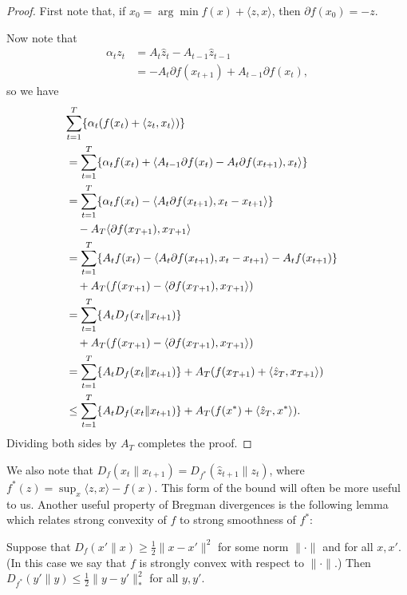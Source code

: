 \documentclass{article} %
\begin{document}
\begin{proof}
First note that, if $x_0 = \arg\min f(x) + \langle z, x \rangle$, 
then $\partial f(x_0) = -z$.

Now note that
\begin{align}
\alpha_{t}z_{t} 
&= A_{t}\hat z_{t} - A_{t-1}\hat z_{t-1} \\
&= - A_{t}\partial f(x_{t+1}) + A_{t-1} \partial f(x_{t}),
\end{align}
so we have
\begin{align} 
\lefteqn{\sum_{t=1}^T \{\alpha_t(f(x_t) + \langle z_t, x_t \rangle)\}} \\
 &= \sum_{t=1}^T \{\alpha_t f(x_t) + \langle A_{t-1} \partial f(x_t) - A_t \partial f(x_{t+1}), x_t \rangle\} \\
 &= \sum_{t=1}^T \{\alpha_t f(x_t) - \langle A_{t} \partial f(x_{t+1}), x_t-x_{t+1} \rangle\} \\
 & \quad - A_{T}\langle \partial f(x_{T+1}), x_{T+1} \rangle \\
 &= \sum_{t=1}^T \{A_t f(x_t) - \langle A_{t} \partial f(x_{t+1}), x_t-x_{t+1} \rangle - A_t f(x_{t+1})\}  \\
 &\quad+ A_T(f(x_{T+1}) - \langle \partial f(x_{T+1}), x_{T+1} \rangle) \nonumber \\ 
 &= \sum_{t=1}^T \{A_tD_f(x_t \| x_{t+1})\}  \\ 
 &\quad+ A_T(f(x_{T+1}) - \langle \partial f(x_{T+1}), x_{T+1} \rangle) \nonumber \\
 &= \sum_{t=1}^T \{A_tD_f(x_t \| x_{t+1})\} + A_T(f(x_{T+1}) + \langle \hat{z}_T, x_{T+1} \rangle) \\
 &\leq \sum_{t=1}^T \{A_tD_f(x_t \| x_{t+1})\} + A_T(f(x^*) + \langle \hat{z}_T, x^* \rangle). 
\end{align}
Dividing both sides by $A_T$ completes the proof.
\end{proof}

We also note that $D_f(x_t \| x_{t+1}) = D_{f^*}(\hat{z}_{t+1} \| z_t)$, where $f^*(z) = \sup_x \langle z,x\rangle - f(x)$. 
This form of the bound will often be more useful to us. Another useful property of Bregman divergences is the following lemma 
which relates strong convexity of $f$ to strong smoothness of $f^*$:
\begin{lemma}
\label{lem:convexity}
Suppose that $D_f(x' \| x) \geq \frac{1}{2}\|x-x'\|^2$ for some 
norm $\|\cdot\|$ and for all $x, x'$. (In this case we say that $f$ is strongly 
convex with respect to $\|\cdot\|$.) 
Then $D_{f^*}(y' \| y) \leq \frac{1}{2}\|y-y'\|_{*}^2$ for all $y, y'$.
\end{lemma}
\end{document}
